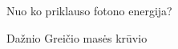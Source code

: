 \question Nuo ko priklauso fotono energija? \begin{choices}
    \choice Dažnio
    \choice Greičio
    \choice masės
    \choice krūvio
\end{choices}